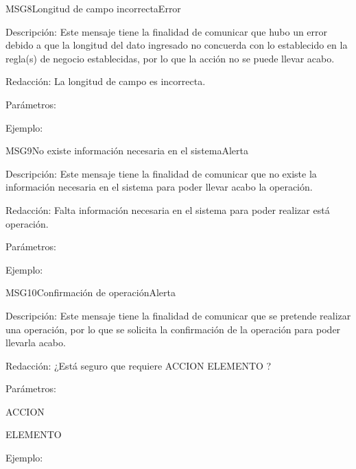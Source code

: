 \begin{mensaje}{MSG8}{Longitud de campo incorrecta}{Error}
	\item[Descripción:]Este mensaje tiene la finalidad de comunicar que hubo un error debido a que la longitud del dato ingresado no concuerda con lo establecido en la regla(s) de negocio establecidas, por lo que la acción no se puede llevar acabo.
	\item[Redacción:]La longitud de campo es incorrecta.
	\item[Parámetros:] 
	\begin{Citemize}
 			\item 
		\end{Citemize}
	\item[Ejemplo:] 
\end{mensaje}

\begin{mensaje}{MSG9}{No existe información necesaria en el sistema}{Alerta}
	\item[Descripción:]Este mensaje tiene la finalidad de comunicar que no existe la información necesaria en el sistema para poder llevar acabo la operación.
	\item[Redacción:]Falta información necesaria en el sistema para poder realizar está operación.
	\item[Parámetros:] 
	\begin{Citemize}
 			\item 
		\end{Citemize}
	\item[Ejemplo:] 
\end{mensaje}

\begin{mensaje}{MSG10}{Confirmación de operación}{Alerta}
	\item[Descripción:]Este mensaje tiene la finalidad de comunicar que se pretende realizar una operación, por lo que se solicita la confirmación de la operación para poder llevarla acabo.
	\item[Redacción:]¿Está seguro que requiere ACCION ELEMENTO ?
	\item[Parámetros:] \hspace{0.1pt}
	\begin{Citemize}
 			\item ACCION
			\item ELEMENTO
		\end{Citemize}
	\item[Ejemplo:] 
\end{mensaje}

